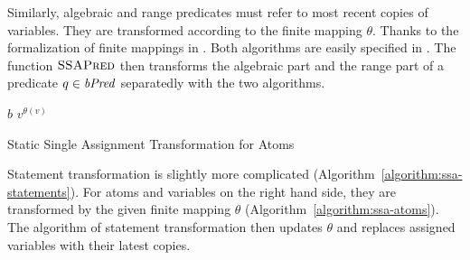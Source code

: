 Similarly, algebraic and range predicates must refer to most recent copies of
variables. They are transformed according to the finite mapping
$\theta$. Thanks to the formalization of finite mappings in \coq. Both
algorithms are easily specified in \gallina.
The function $\textsc{SSAPred}$ then transforms the algebraic part and the range part of a predicate $q \in \mathit{bPred}$ separatedly with the two algorithms.


\begin{algorithm}
  \begin{algorithmic}[1]
        \Return $b$
      \EndCase
        \Return $v^{\theta(v)}$
      \EndCase
    \EndMatch
    \EndFunction
  \end{algorithmic}
  \caption{Static Single Assignment Transformation for Atoms}
  \label{algorithm:ssa-atoms}
\end{algorithm}

Statement transformation is slightly more complicated
(Algorithm~\ref{algorithm:ssa-statements}). For
atoms and variables on the right hand side, they are transformed by the given
finite mapping $\theta$ (Algorithm~\ref{algorithm:ssa-atoms}).
The algorithm of statement transformation then updates $\theta$ and
replaces assigned variables with their latest copies.

